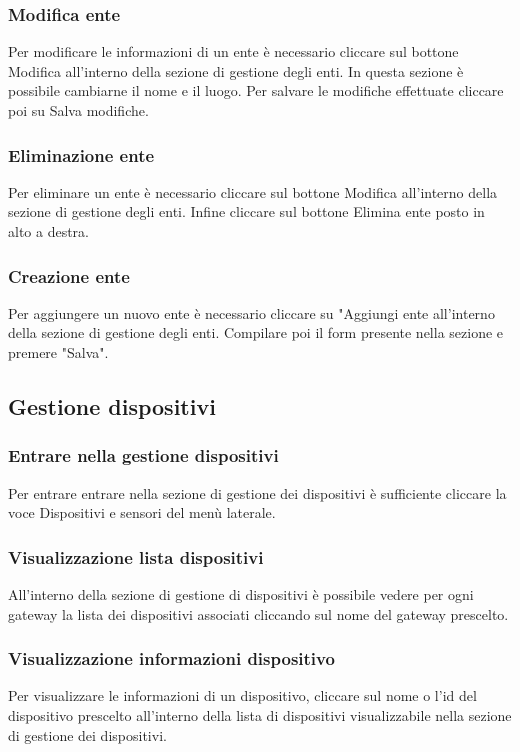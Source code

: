 	\subsubsection{Modifica ente}	
		Per modificare le informazioni di un ente è necessario cliccare sul bottone Modifica all'interno della sezione di gestione degli enti.
		In questa sezione è possibile cambiarne il nome e il luogo. Per salvare le modifiche effettuate cliccare poi su Salva modifiche.

	\subsubsection{Eliminazione ente}	
		Per eliminare un ente è necessario cliccare sul bottone Modifica all'interno della sezione di gestione degli enti.
		Infine cliccare sul bottone Elimina ente posto in alto a destra.

	\subsubsection{Creazione ente}
		Per aggiungere un nuovo ente è necessario cliccare su "Aggiungi ente all'interno della sezione di gestione degli enti. Compilare poi il form presente nella sezione e premere "Salva".

\subsection{Gestione dispositivi}

	\subsubsection{Entrare nella gestione dispositivi}
		Per entrare entrare nella sezione di gestione dei dispositivi è sufficiente cliccare la voce Dispositivi e sensori del menù laterale.

	\subsubsection{Visualizzazione lista dispositivi}
		All'interno della sezione di gestione di dispositivi è possibile vedere per ogni gateway la lista dei dispositivi associati cliccando sul nome del gateway prescelto. 

	\subsubsection{Visualizzazione informazioni dispositivo}
		Per visualizzare le informazioni di un dispositivo, cliccare sul nome o l'id del dispositivo prescelto all'interno della lista di dispositivi visualizzabile nella sezione di gestione dei dispositivi.

